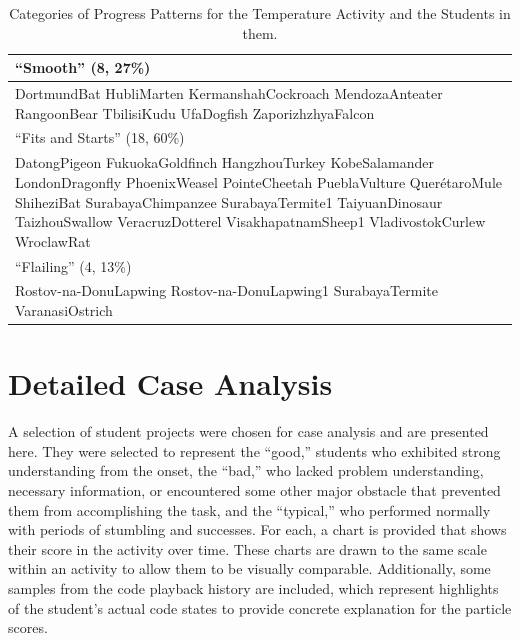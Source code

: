 \begin{table}
\begin{centering}
	\begin{tabular}{p{\textwidth}}
	\hline \hline
	``Smooth'' (8, 27\%)\\ \hline
		DortmundBat
		HubliMarten
		KermanshahCockroach
		MendozaAnteater
		RangoonBear
		TbilisiKudu
		UfaDogfish
		ZaporizhzhyaFalcon
		\\ \hline \hline
	``Fits and Starts'' (18, 60\%)\\ \hline
		DatongPigeon
		FukuokaGoldfinch
		HangzhouTurkey
		KobeSalamander
		LondonDragonfly
		PhoenixWeasel
		PointeCheetah
		PueblaVulture
		QuerétaroMule
		ShiheziBat
		SurabayaChimpanzee
		SurabayaTermite1
		TaiyuanDinosaur
		TaizhouSwallow
		VeracruzDotterel
		VisakhapatnamSheep1
		VladivostokCurlew
		WroclawRat
		\\ \hline \hline
	``Flailing'' (4, 13\%)\\ \hline
		Rostov-na-DonuLapwing
		Rostov-na-DonuLapwing1
		SurabayaTermite
		VaranasiOstrich
		\\ \hline

	\end{tabular}
	\caption[Categories of Progress Patterns for the Temperature Activity]{Categories of Progress Patterns for the Temperature Activity and the Students in them.}
	\label{tab:pattern_names_temp}
\end{centering}
\end{table}


\section{Detailed Case Analysis}
\label{sec:case_analysis}
A selection of student projects were chosen for case analysis and are presented here. They were selected to represent the ``good,'' students who exhibited strong understanding from the onset, the ``bad,'' who lacked problem understanding, necessary information, or encountered some other major obstacle that prevented them from accomplishing the task, and the ``typical,'' who performed normally with periods of stumbling and successes. For each, a chart is provided that shows their score in the activity over time. These charts are drawn to the same scale within an activity to allow them to be visually comparable. Additionally, some samples from the code playback history are included, which represent highlights of the student's actual code states to provide concrete explanation for the particle scores.

